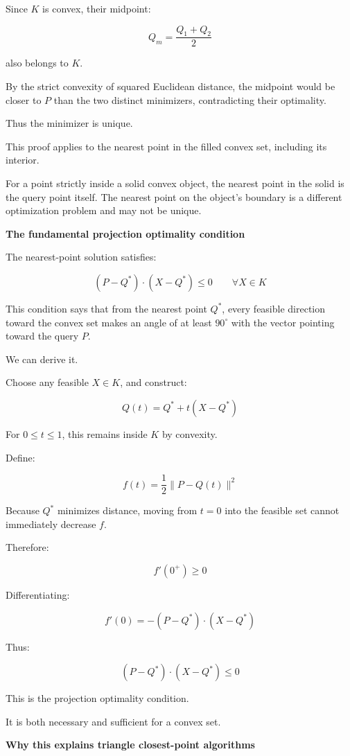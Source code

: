 Since \(K\) is convex, their midpoint:

\[
Q_m=\frac{Q_1+Q_2}{2}
\]

also belongs to \(K\).

By the strict convexity of squared Euclidean distance, the midpoint would be closer to \(P\) than the two distinct minimizers, contradicting their optimality.

Thus the minimizer is unique.

This proof applies to the nearest point in the filled convex set, including its interior.

For a point strictly inside a solid convex object, the nearest point in the solid is the query point itself. The nearest point on the object's boundary is a different optimization problem and may not be unique.

\textbf{The fundamental projection optimality condition}

The nearest-point solution satisfies:

\[
\boxed{ (P-Q^*)\cdot(X-Q^*)\le0 \qquad\forall X\in K }
\]

This condition says that from the nearest point \(Q^*\), every feasible direction toward the convex set makes an angle of at least \(90^\circ\) with the vector pointing toward the query \(P\).

We can derive it.

Choose any feasible \(X\in K\), and construct:

\[
Q(t)=Q^*+t(X-Q^*)
\]

For \(0\le t\le1\), this remains inside \(K\) by convexity.

Define:

\[
f(t)=\frac12\|P-Q(t)\|^2
\]

Because \(Q^*\) minimizes distance, moving from \(t=0\) into the feasible set cannot immediately decrease \(f\).

Therefore:

\[
f'(0^+)\ge0
\]

Differentiating:

\[
f'(0)=-(P-Q^*)\cdot(X-Q^*)
\]

Thus:

\[
(P-Q^*)\cdot(X-Q^*)\le0
\]

This is the projection optimality condition.

It is both necessary and sufficient for a convex set.

\textbf{Why this explains triangle closest-point algorithms}

